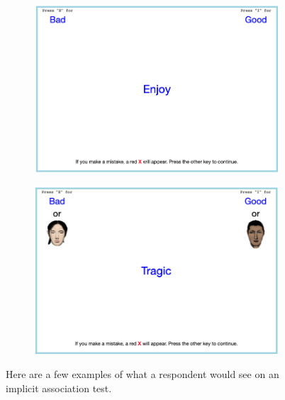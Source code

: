 \documentclass[12pt,english]{article}
\begin{document}
\begin{appendices}
\begin{figure}[!htb]
\begin{subfigure}{.48\textwidth}
\end{subfigure}
\begin{subfigure}{.48\textwidth}
\centering
\includegraphics[width=.9\linewidth]{figure/iatexample4.png}
\end{subfigure}
\begin{subfigure}{.48\textwidth}
\centering
\includegraphics[width=.9\linewidth]{figure/iatexample5.png}
\end{subfigure}
\caption*{\footnotesize{Here are a few examples of what a respondent would see on an implicit association test.}}
\end{figure}


\end{appendices}
\end{document}
